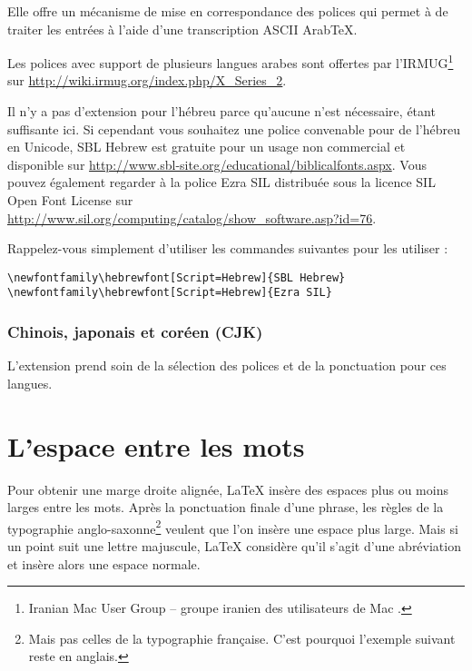 Elle offre un mécanisme de mise en correspondance des polices qui
permet à  de traiter les entrées à l'aide d'une
transcription ASCII Arab\TeX.

Les polices avec support de plusieurs langues arabes sont offertes
par l'IRMUG\footnote{Iranian Mac User Group -- groupe iranien des
  utilisateurs de Mac \NdT.} sur
\url{http://wiki.irmug.org/index.php/X_Series_2}.

Il n'y a pas d'extension pour l'hébreu parce qu'aucune
n'est nécessaire,  étant suffisante ici. Si cependant
vous souhaitez une police convenable pour de l'hébreu en Unicode, SBL
Hebrew est gratuite pour un usage non commercial et disponible sur
\url{http://www.sbl-site.org/educational/biblicalfonts.aspx}. Vous
pouvez également regarder à la police Ezra SIL distribuée sous la
licence SIL Open Font License sur
\url{http://www.sil.org/computing/catalog/show_software.asp?id=76}.

Rappelez-vous simplement d'utiliser les commandes suivantes pour les
utiliser :

\begin{lscommand}
\verb|\newfontfamily\hebrewfont[Script=Hebrew]{SBL Hebrew}| \\
\verb|\newfontfamily\hebrewfont[Script=Hebrew]{Ezra SIL}|
\end{lscommand}

\subsubsection{Chinois, japonais et coréen (CJK)}

L'extension \cite{xecjk} prend soin de la sélection des
polices et de la ponctuation pour ces langues.

\section{L'espace entre les mots}

Pour obtenir une marge droite alignée, \LaTeX{} insère des espaces
plus ou moins larges entre les mots. Après la ponctuation finale
d'une phrase, les règles de la typographie anglo-saxonne\footnote{Mais pas
  celles de la typographie française. C'est pourquoi l'exemple suivant reste
  en anglais. \NdT} veulent que
l'on insère une espace plus large.  Mais si un point suit une lettre
majuscule, \LaTeX{} considère qu'il s'agit d'une abréviation et insère
alors une espace normale.

